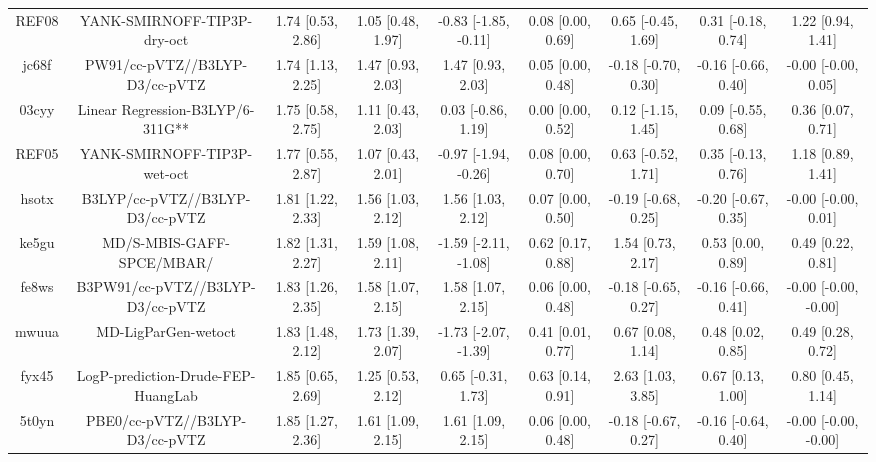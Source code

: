 \documentclass{article}
\begin{document}
\begin{center}
\begin{longtable}{|ccccccccc|}
 REF08 &                        YANK-SMIRNOFF-TIP3P-dry-oct &  1.74 [0.53, 2.86] &  1.05 [0.48, 1.97] &  -0.83 [-1.85, -0.11] &  0.08 [0.00, 0.69] &   0.65 [-0.45, 1.69] &   0.31 [-0.18, 0.74] &     1.22 [0.94, 1.41] \\
 jc68f &                     PW91/cc-pVTZ//B3LYP-D3/cc-pVTZ &  1.74 [1.13, 2.25] &  1.47 [0.93, 2.03] &     1.47 [0.93, 2.03] &  0.05 [0.00, 0.48] &  -0.18 [-0.70, 0.30] &  -0.16 [-0.66, 0.40] &   -0.00 [-0.00, 0.05] \\
 03cyy &                   Linear Regression-B3LYP/6-311G** &  1.75 [0.58, 2.75] &  1.11 [0.43, 2.03] &    0.03 [-0.86, 1.19] &  0.00 [0.00, 0.52] &   0.12 [-1.15, 1.45] &   0.09 [-0.55, 0.68] &     0.36 [0.07, 0.71] \\
 REF05 &                        YANK-SMIRNOFF-TIP3P-wet-oct &  1.77 [0.55, 2.87] &  1.07 [0.43, 2.01] &  -0.97 [-1.94, -0.26] &  0.08 [0.00, 0.70] &   0.63 [-0.52, 1.71] &   0.35 [-0.13, 0.76] &     1.18 [0.89, 1.41] \\
 hsotx &                    B3LYP/cc-pVTZ//B3LYP-D3/cc-pVTZ &  1.81 [1.22, 2.33] &  1.56 [1.03, 2.12] &     1.56 [1.03, 2.12] &  0.07 [0.00, 0.50] &  -0.19 [-0.68, 0.25] &  -0.20 [-0.67, 0.35] &   -0.00 [-0.00, 0.01] \\
 ke5gu &                          MD/S-MBIS-GAFF-SPCE/MBAR/ &  1.82 [1.31, 2.27] &  1.59 [1.08, 2.11] &  -1.59 [-2.11, -1.08] &  0.62 [0.17, 0.88] &    1.54 [0.73, 2.17] &    0.53 [0.00, 0.89] &     0.49 [0.22, 0.81] \\
 fe8ws &                   B3PW91/cc-pVTZ//B3LYP-D3/cc-pVTZ &  1.83 [1.26, 2.35] &  1.58 [1.07, 2.15] &     1.58 [1.07, 2.15] &  0.06 [0.00, 0.48] &  -0.18 [-0.65, 0.27] &  -0.16 [-0.66, 0.41] &  -0.00 [-0.00, -0.00] \\
 mwuua &                                MD-LigParGen-wetoct &  1.83 [1.48, 2.12] &  1.73 [1.39, 2.07] &  -1.73 [-2.07, -1.39] &  0.41 [0.01, 0.77] &    0.67 [0.08, 1.14] &    0.48 [0.02, 0.85] &     0.49 [0.28, 0.72] \\
 fyx45 &                 LogP-prediction-Drude-FEP-HuangLab &  1.85 [0.65, 2.69] &  1.25 [0.53, 2.12] &    0.65 [-0.31, 1.73] &  0.63 [0.14, 0.91] &    2.63 [1.03, 3.85] &    0.67 [0.13, 1.00] &     0.80 [0.45, 1.14] \\
 5t0yn &                     PBE0/cc-pVTZ//B3LYP-D3/cc-pVTZ &  1.85 [1.27, 2.36] &  1.61 [1.09, 2.15] &     1.61 [1.09, 2.15] &  0.06 [0.00, 0.48] &  -0.18 [-0.67, 0.27] &  -0.16 [-0.64, 0.40] &  -0.00 [-0.00, -0.00] \\

\end{longtable}
\end{center}
\end{document}
